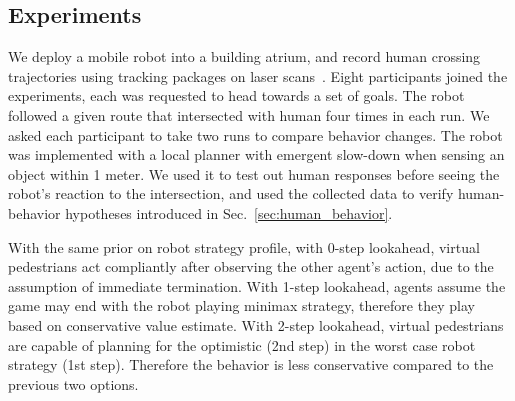\documentclass[letterpaper, 10 pt, conference]{ieeeconf}  %
\begin{document}

\vspace{-.2em}
\subsection{Experiments}
\vspace{-.2em}
We deploy a mobile robot into a building atrium, and record human crossing 
trajectories using tracking packages on laser scans~\cite{leigh2015person}. 
Eight participants joined the experiments, each was requested to head towards 
a set of goals. The robot followed a given route 
that intersected with human four times in each run. We asked each participant 
to take two runs to compare behavior changes. The robot was implemented with a 
local planner with emergent slow-down when sensing an object within 1 meter. 
We used it to test out human responses before seeing the robot's reaction to 
the intersection, and used the collected data to verify human-behavior 
hypotheses introduced in Sec.~\ref{sec:human_behavior}. 

With the same prior on robot strategy profile, with 0-step lookahead, 
virtual pedestrians act compliantly after observing the other agent's action, 
due to the assumption of immediate termination. With 1-step lookahead, agents assume 
the game may end with the robot playing minimax strategy, therefore they play 
based on conservative value estimate. With 2-step lookahead, virtual 
pedestrians are capable of planning for the optimistic (2nd step) in the 
worst case robot strategy (1st step). Therefore the behavior is less 
conservative compared to the previous two options. 
\end{document}
